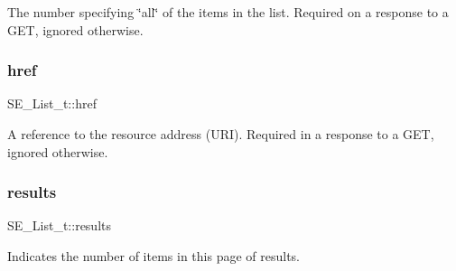 The number specifying \char`\"{}all\char`\"{} of the items in the list. Required on a response to a G\+ET, ignored otherwise. \mbox{\label{group__List_ga292140ab8456be369391e06dec3936e3}} 
\subsubsection{\texorpdfstring{href}{href}}
{\footnotesize\ttfamily S\+E\+\_\+\+List\+\_\+t\+::href}

A reference to the resource address (U\+RI). Required in a response to a G\+ET, ignored otherwise. \mbox{\label{group__List_ga7214cada4051d8f8873195463eddbd7e}} 
\subsubsection{\texorpdfstring{results}{results}}
{\footnotesize\ttfamily S\+E\+\_\+\+List\+\_\+t\+::results}

Indicates the number of items in this page of results. 